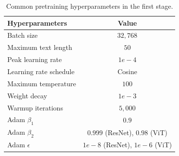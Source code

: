 \begin{table}[t]
\center
\small
\begin{tabular}{lc}
\toprule
  Hyperparameters
  & Value
  \\
\midrule
    Batch size
    & $32,768$
    \\
    Maximum text length
    & $50$
    \\             
    Peak learning rate
    & $1e-4$
    \\
    Learning rate schedule
    & Cosine
    \\    
    Maximum temperature
    & $100$
    \\
    Weight decay
    & $1e-3$
    \\        
    Warmup iterations
    & $5,000$
    \\        
    Adam $\beta_1$
    & $0.9$
    \\      
    Adam $\beta_2$
    & $0.999$ (ResNet), $0.98$ (ViT)
    \\     
    Adam $\epsilon$
    & $1e-8$ (ResNet), $1e-6$ (ViT)
    \\        
\bottomrule
\end{tabular}
\caption{Common pretraining hyperparameters in the first stage.}
\label{tb:hyperparams_stage1}
\end{table}